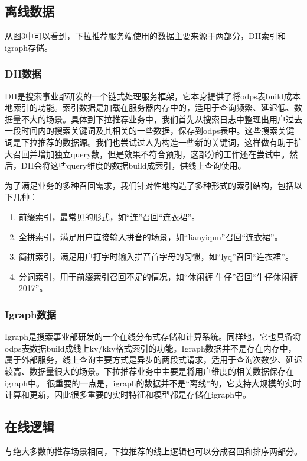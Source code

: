 \subsection{离线数据	}
从图3中可以看到，下拉推荐服务端使用的数据主要来源于两部分，DII索引和igraph存储。

\subsubsection{DII数据}
DII是搜索事业部研发的一个链式处理服务框架，它本身提供了将odps表build成本地索引的功能。索引数据是加载在服务器内存中的，适用于查询频繁、延迟低、数据量不大的场景。具体到下拉推荐业务中，我们首先从搜索日志中整理出用户过去一段时间内的搜索关键词及其相关的一些数据，保存到odps表中。这些搜索关键词是下拉推荐的数据源。我们也尝试过人为构造一些新的关键词，这样做有助于扩大召回并增加独立query数，但是效果不符合预期，这部分的工作还在尝试中。然后，DII会将这些query维度的数据build成索引，供线上查询使用。
\par 为了满足业务的多种召回需求，我们针对性地构造了多种形式的索引结构，包括以下几种：
\begin{enumerate}
\item 前缀索引，最常见的形式，如“连”召回“连衣裙”。
\item 全拼索引，满足用户直接输入拼音的场景，如“lianyiqun”召回“连衣裙”。
\item 简拼索引，满足用户打字时输入拼音首字母的习惯，如“lyq”召回“连衣裙”。
\item 分词索引，用于前缀索引召回不足的情况，如“休闲裤 牛仔”召回“牛仔休闲裤2017”。
\end{enumerate}
\subsubsection{Igraph数据}
Igraph是搜索事业部研发的一个在线分布式存储和计算系统。同样地，它也具备将odps表数据build成线上kv/kkv格式索引的功能。Igraph数据并不是存在内存中，属于外部服务，线上查询主要方式是异步的两段式请求，适用于查询次数少、延迟较高、数据量很大的场景。下拉推荐业务中主要是将用户维度的相关数据保存在igraph中。
很重要的一点是，igraph的数据并不是“离线”的，它支持大规模的实时计算和更新，因此很多重要的实时特征和模型都是存储在igraph中。
\subsection{在线逻辑}
与绝大多数的推荐场景相同，下拉推荐的线上逻辑也可以分成召回和排序两部分。
